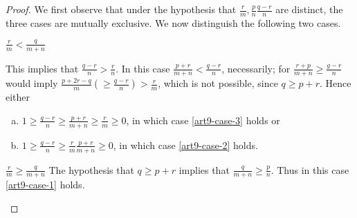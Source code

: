 \begin{proof}
We first observe that under the hypothesis that $\frac{r}{m}, \frac{p}{n} \frac{q-r}{n}$ are distinct, the three cases are mutually exclusive. We now distinguish the following two cases. 

\setcounter{case}{0}
\begin{case}\label{art9-case-1}
$\frac{r}{m} < \frac{q}{m+n}$

\noindent
This implies that $\frac{q-r}{n} > \frac{r}{n}$. In this case $\frac{p+r}{m+n} < \frac{q-r}{n}$, necessarily; for $\frac{r+p}{m+n} \geq \frac{g-r}{n}$ would imply $\frac{p+2r-q}{m}(\geq \frac{q-r}{n}) > \frac{r}{m}$, which is not possible, since $q \geq p +r$. Hence either
\begin{enumerate}[(a)]
 \item $1 \geq \frac{q-r}{n} \geq \frac{p+r}{m+n} \geq \frac{r}{m} \geq 0$, in which case
 \eqref{art9-case-3} holds or\label{art9-case-1-enum-a}
 \item $ 1 \geq \frac{q-r}{n} \geq \frac{r}{m} \frac{p+r}{m+n} \geq 0$, in which case \eqref{art9-case-2}
 holds.\label{art9-case-1-enum-b}
\end{enumerate}
\end{case}

\begin{case}\label{art9-case-2}
$\frac{r}{m}\geq \frac{q}{m+n}$  The hypothesis that $q\geq p + r$ implies that $ \frac{q}{m+n} \geq \frac{p}{n}$.
Thus in this case \eqref{art9-case-1} holds.
\end{case}
\end{proof}

\setcounter{subsection}{1}
